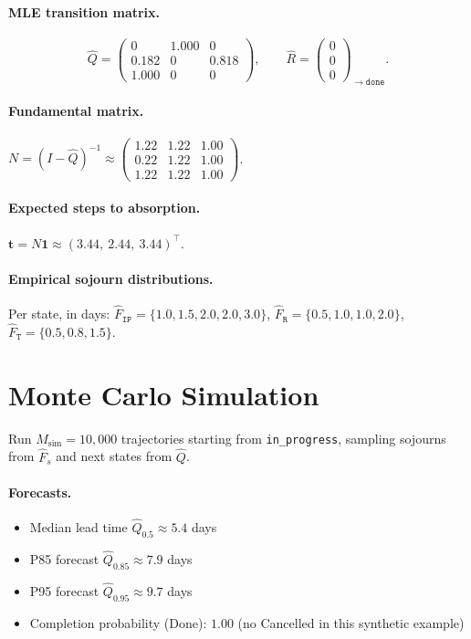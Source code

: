 \paragraph{MLE transition matrix.}
\begin{equation*}
\hat{Q} = \begin{pmatrix}
0    & 1.000 & 0     \\
0.182 & 0    & 0.818 \\
1.000 & 0    & 0
\end{pmatrix},
\qquad
\hat{R} = \begin{pmatrix}
0 \\ 0 \\ 0
\end{pmatrix}_{\to \mathtt{done}}.
\end{equation*}

\paragraph{Fundamental matrix.}
$N = (I - \hat{Q})^{-1} \approx \begin{pmatrix}
1.22 & 1.22 & 1.00 \\
0.22 & 1.22 & 1.00 \\
1.22 & 1.22 & 1.00
\end{pmatrix}$.

\paragraph{Expected steps to absorption.}
$\mathbf{t} = N \mathbf{1} \approx (3.44,\ 2.44,\ 3.44)^\top$.

\paragraph{Empirical sojourn distributions.} Per state, in days:
$\hat{F}_{\mathtt{IP}} = \{1.0, 1.5, 2.0, 2.0, 3.0\}$,
$\hat{F}_{\mathtt{R}}  = \{0.5, 1.0, 1.0, 2.0\}$,
$\hat{F}_{\mathtt{T}}  = \{0.5, 0.8, 1.5\}$.


\section{Monte Carlo Simulation}
\label{app:D-mc}

Run $M_{\mathrm{sim}} = 10{,}000$ trajectories starting from
\texttt{in\_progress}, sampling sojourns from $\hat{F}_s$ and next states
from $\hat{Q}$.

\paragraph{Forecasts.}
\begin{itemize}
  \item Median lead time $\hat{Q}_{0.5} \approx 5.4$ days
  \item P85 forecast $\hat{Q}_{0.85} \approx 7.9$ days
  \item P95 forecast $\hat{Q}_{0.95} \approx 9.7$ days
  \item Completion probability (Done): $1.00$ (no Cancelled in this
    synthetic example)
\end{itemize}

